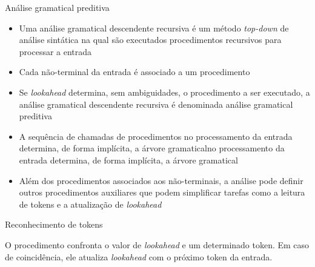 \begin{frame}[fragile]{Análise gramatical preditiva}

    \begin{itemize}
        \item Uma análise gramatical descendente recursiva é um método \textit{top-down} de análise sintática na qual são executados procedimentos recursivos
            para processar a entrada
        \pause

        \item Cada não-terminal da entrada é associado a um procedimento
        \pause

        \item Se \textit{lookahead} determina, sem ambiguidades, o procedimento a ser executado, a análise gramatical descendente recursiva é denominada
        análise gramatical preditiva
        \pause

        \item A sequência de chamadas de procedimentos no processamento da entrada determina, de forma implícita, a árvore gramaticalno processamento da entrada determina, de forma implícita, a árvore gramatical
        \pause

        \item Além dos procedimentos associados aos não-terminais, a análise pode definir outros procedimentos auxiliares que podem simplificar tarefas como
            a leitura de tokens e a atualização de \textit{lookahead}
    \end{itemize}

\end{frame}

\begin{frame}[fragile]{Reconhecimento de tokens}

    O procedimento  confronta o valor de \textit{lookahead} e um determinado token. Em caso de coincidência, ele atualiza \textit{lookahead} com
    o próximo token da entrada.
    \pause
    
    \vspace{0.2in}
    \begin{algorithmic}[1]
        \Statex
        \Else
        \EndIf
        \EndProcedure
    \end{algorithmic}
\end{frame}


